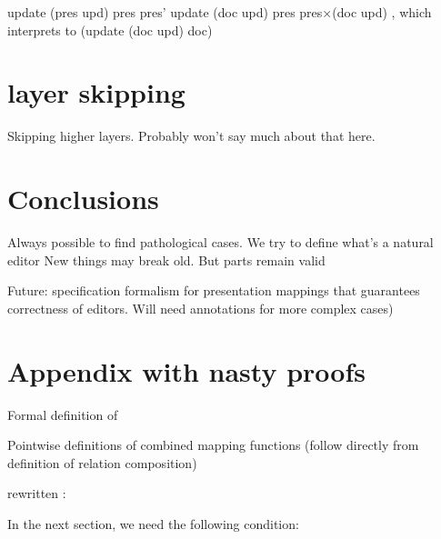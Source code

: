 update (pres upd) pres \rarr pres'
update (doc upd) pres \rarr pres$\times$(doc upd) , which interprets to (update (doc upd) doc)


%																
%																
%																
\section{layer skipping}
Skipping higher layers. Probably won't say much about that here.

\section{Conclusions}

Always possible to find pathological cases.
We try to define what's a natural editor
New things may break old. But parts remain valid

Future: specification formalism for presentation mappings that guarantees correctness of editors. Will need annotations for more complex cases)

\pagebreak
\section{Appendix with nasty proofs}


Formal definition of \valid
{}

Pointwise definitions of combined mapping functions (follow directly from definition of relation composition)

rewritten :



In the next section, we need the following condition:

